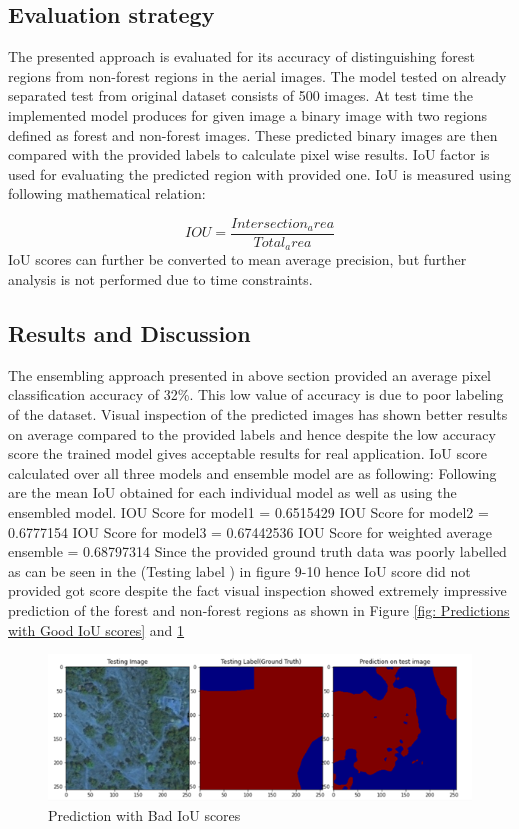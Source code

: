 \documentclass[rnd]{mas_proposal}
\begin{document}
\subsection{Evaluation strategy}



The presented approach is evaluated for its accuracy of distinguishing forest regions from non-forest regions in the aerial images. The model tested on already separated test from original dataset consists of 500 images. At test time the implemented model produces for given image a binary image with two regions defined as forest and non-forest images. These predicted binary images are then compared with the provided labels to calculate pixel wise results. IoU factor is used for evaluating the predicted region with provided one. 
IoU is measured using following mathematical relation:

$$IOU=\frac{Intersection_area}{Total_area }$$
IoU scores can further be converted to mean average precision, but further analysis is not performed due to time constraints. 


\subsection{Results and Discussion}

The ensembling approach presented in above section provided an average pixel classification accuracy of 32\%. This low value of accuracy is due to poor 
labeling of the dataset. Visual inspection of the predicted images has shown better results on average compared to the provided labels and hence despite the 
low accuracy score the trained model gives acceptable results for real application. IoU score calculated over all 
three models and ensemble model are as following:
Following are the mean IoU obtained for each individual model as well as using the ensembled model.
IOU Score for model1 =  0.6515429
IOU Score for model2 =  0.6777154
IOU Score for model3 =  0.67442536
IOU Score for weighted average ensemble =  0.68797314 
Since the provided ground truth data was poorly labelled as can be seen in the (Testing label ) in figure 9-10 hence IoU score did not provided got score 
despite the fact visual inspection showed extremely impressive prediction of the forest and non-forest regions as shown in 
Figure \ref{fig: Predictions with Good IoU scores} and \ref{fig: Prediction with Bad IoU scores}

\begin{figure}[htp] 
        \centering
        \includegraphics[width=1.2\textwidth]{images/fig12.png}
        \caption{ Prediction with Bad IoU scores}%
        \label{fig: Prediction with Bad IoU scores}%
\end{figure}
\end{document}
